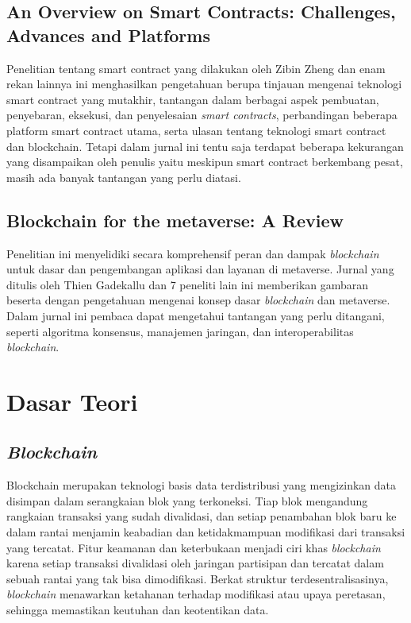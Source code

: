 \subsection{An Overview on Smart Contracts: Challenges, Advances and Platforms}
Penelitian tentang smart contract yang dilakukan oleh Zibin Zheng dan enam rekan lainnya ini menghasilkan pengetahuan berupa tinjauan mengenai teknologi smart contract yang mutakhir, tantangan dalam berbagai aspek pembuatan, penyebaran, eksekusi, dan penyelesaian \emph{smart contracts}, perbandingan beberapa platform smart contract utama, serta ulasan tentang teknologi smart contract dan blockchain. Tetapi dalam jurnal ini tentu saja terdapat beberapa kekurangan yang disampaikan oleh penulis yaitu meskipun smart contract berkembang pesat, masih ada banyak tantangan yang perlu diatasi.

\subsection{Blockchain for the metaverse: A Review}
Penelitian ini menyelidiki secara komprehensif peran dan dampak \emph{blockchain} untuk dasar dan pengembangan aplikasi dan layanan di metaverse. Jurnal yang ditulis oleh Thien Gadekallu dan 7 peneliti lain ini memberikan gambaran beserta dengan pengetahuan mengenai konsep dasar \emph{blockchain} dan metaverse. Dalam jurnal ini pembaca dapat mengetahui tantangan yang perlu ditangani, seperti algoritma konsensus, manajemen jaringan, dan interoperabilitas \emph{blockchain}. 

\section{Dasar Teori}

\subsection{\emph{Blockchain}}
Blockchain merupakan teknologi basis data terdistribusi yang mengizinkan data disimpan dalam serangkaian blok yang terkoneksi. Tiap blok mengandung rangkaian transaksi yang sudah divalidasi, dan setiap penambahan blok baru ke dalam rantai menjamin keabadian dan ketidakmampuan modifikasi dari transaksi yang tercatat. Fitur keamanan dan keterbukaan menjadi ciri khas \emph{blockchain} karena setiap transaksi divalidasi oleh jaringan partisipan dan tercatat dalam sebuah rantai yang tak bisa dimodifikasi. Berkat struktur terdesentralisasinya, \emph{blockchain} menawarkan ketahanan terhadap modifikasi atau upaya peretasan, sehingga memastikan keutuhan dan keotentikan data. \cite{Tjokrosetio22}

